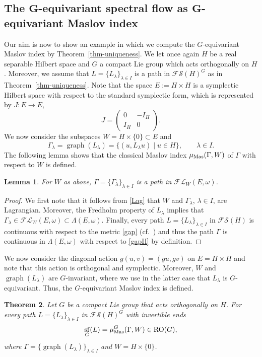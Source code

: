 \documentclass[pdftex]{sigma}
\numberwithin{equation}{section}
\newtheorem{Theorem}{Theorem}[section]
\newtheorem{Lemma}[Theorem]{Lemma}
\theoremstyle{definition}
\DeclareMathOperator{\sfl}{sf}
\DeclareMathOperator{\gra}{graph}
\begin{document}
\subsection{The \texorpdfstring{$\boldsymbol{G}$}{G}-equivariant spectral flow as \texorpdfstring{$\boldsymbol{G}$}{G}-equivariant Maslov index}
Our aim is now to show an example in which we compute the $G$-equivariant Maslov index by Theorem~\ref{thm-uniqueness}. We let once again $H$ be a real separable Hilbert space and $G$ a compact Lie group which acts orthogonally on $H$. Moreover, we assume that $L=\{L_\lambda\}_{\lambda\in I}$ is a path in $\mathcal{FS}(H)^G$ as in Theorem~\ref{thm-uniqueness}. Note that the space $E:=H\times H$ is a symplectic Hilbert space with respect to the standard symplectic form, which is represented by $J \colon E\rightarrow E$,
\[J=\begin{pmatrix}
0&-I_H\\
I_H&0
\end{pmatrix}.\]
We now consider the subspaces $W=H\times\{0\}\subset E$ and
\[\Gamma_\lambda=\gra(L_\lambda)=\{(u,L_\lambda u)\mid u\in H\},\qquad \lambda\in I.\]
The following lemma shows that the classical Maslov index $\mu_{\rm Mas}(\Gamma,W)$ of $\Gamma$ with respect to $W$ is defined.

\begin{Lemma}\label{lemma-FLW}
For $W$ as above, $\Gamma=\{\Gamma_\lambda\}_{\lambda\in I}$ is a path in $\mathcal{FL}_W(E,\omega)$.
\end{Lemma}

\begin{proof}
We first note that it follows from \eqref{Lag} that $W$ and $\Gamma_\lambda$, $\lambda\in I$, are Lagrangian. Moreover, the Fredholm property of $L_\lambda$ implies that $\Gamma_\lambda\in\mathcal{FL}_W(E,\omega)\subset\Lambda(E,\omega)$. Finally, every path $L=\{L_\lambda\}_{\lambda\in I}$ in $\mathcal{FS}(H)$ is continuous with respect to the metric \eqref{gap} (cf.\ \cite{Lesch}) and thus the path $\Gamma$ is continuous in $\Lambda(E,\omega)$ with respect to \eqref{gapII} by definition.
\end{proof}

We now consider the diagonal action $g(u,v)=(gu,gv)$ on $E=H\times H$ and note that this action is orthogonal and symplectic. Moreover, $W$ and $\gra(L_\lambda)$ are $G$-invariant, where we use in the latter case that $L_\lambda$ is $G$-equivariant. Thus, the $G$-equivariant Maslov index is defined.

\begin{Theorem}\label{thm-Maslov}
Let $G$ be a compact Lie group that acts orthogonally on $H$. For every path $L=\{L_\lambda\}_{\lambda\in I}$ in $\mathcal{FS}(H)^G$ with invertible ends
\[\sfl_G(L)=\mu^G_{\rm Mas}(\Gamma,W)\in \mathrm{RO}(G),\]
where $\Gamma=\{\gra(L_\lambda)\}_{\lambda\in I}$ and $W=H\times\{0\}$.
\end{Theorem}
\end{document}
